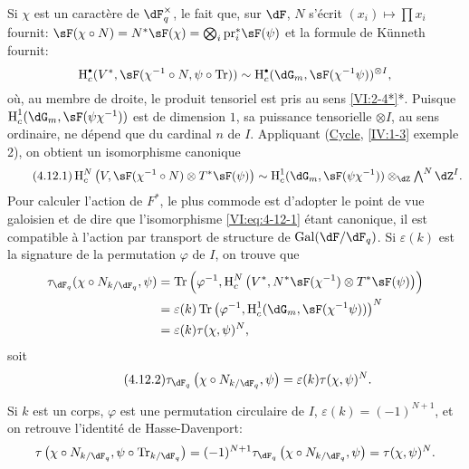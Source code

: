 Si $\chi$ est un caractère de $\dF_q^\times$, le fait que, sur $\dF$, $N$ 
s'écrit $(x_i)\mapsto \prod x_i$ fournit: 
$\sF(\chi\circ N)=N^\ast\sF(\chi) = \bigotimes_i \pr_i^\ast\sF(\psi)$ 
et la formule de K\"unneth fournit: 
\[
  \h_c^\bullet(V^\ast,\sF(\chi^{-1}\circ N,\psi\circ \tr)) \sim \h_c^\bullet(\dG_m,\sF(\chi^{-1}\psi))^{\otimes I} \text{,} 
\]
où, au membre de droite, le produit tensoriel est pris au sens 
\ref{VI:2-4*}*. Puisque $\h_c^1(\dG_m,\sF(\psi\chi^{-1}))$ est de dimension 
$1$, sa puissance tensorielle $\otimes I$, au sens ordinaire, ne dépend que 
du cardinal $n$ de $I$. Appliquant (\hyperref[IV]{Cycle}, \ref{IV:1-3} exemple 
2), on obtient un isomorphisme canonique 
\begin{equation*}\tag{4.12.1}\label{VI:eq:4-12-1}
  \h_c^N\left(V,\sF(\chi^{-1}\circ N)\otimes T^\ast \sF(\psi)\right) \sim \h_c^1(\dG_m,\sF(\psi\chi^{-1})) \otimes_\dZ \textstyle \bigwedge^N \dZ^I \text{.}
\end{equation*}
Pour calculer l'action de $F^\ast$, le plus commode est d'adopter le point de 
vue galoisien et de dire que l'isomorphisme \eqref{VI:eq:4-12-1} étant 
canonique, il est compatible à l'action par transport de structure de 
$\gal(\dF/\dF_q)$. Si $\varepsilon(k)$ est la signature de la permutation 
$\varphi$ de $I$, on trouve que 
\begin{align*} 
  \tau_{\dF_q}(\chi\circ N_{k/\dF_q},\psi) 
    &= \tr\left(\varphi^{-1},\h_c^N\left(V^\ast,N^\ast\sF(\chi^{-1})\otimes T^\ast \sF(\psi)\right)\right) \\ 
    &= \varepsilon(k) \tr\left(\varphi^{-1},\h_c^1(\dG_m,\sF(\chi^{-1}\psi))\right)^N \\
    &= \varepsilon(k) \tau(\chi,\psi)^N \text{,} 
\end{align*}
soit 
\begin{equation*}\tag{4.12.2}\label{VI:eq:4-12-2}
  \tau_{\dF_q}\left(\chi\circ N_{k/\dF_q},\psi\right) = \varepsilon(k) \tau(\chi,\psi)^N \text{.} 
\end{equation*}

Si $k$ est un corps, $\varphi$ est une permutation circulaire de $I$, 
$\varepsilon(k) = (-1)^{N+1}$, et on retrouve l'identité de Hasse-Davenport: 
\[
  \tau\left(\chi\circ N_{k/\dF_q},\psi\circ \tr_{k/\dF_q}\right) = (-1)^{N+1} \tau_{\dF_q}\left(\chi\circ N_{k/\dF_q},\psi\right) = \tau(\chi,\psi)^N \text{.} 
\]





